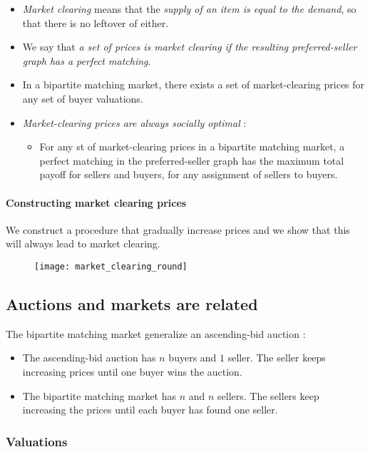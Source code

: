 \begin{itemize}
\item \textit{Market clearing} means that the \textit{supply of an item is equal to the demand}, so that there is no leftover of either.
\item We say that \textit{a set of prices is market clearing if the resulting preferred-seller graph has a perfect matching}.
\item In a bipartite matching market, there exists a set of market-clearing prices for any set of buyer valuations.
\item \textit{Market-clearing prices are always socially optimal} :
	\begin{itemize}
	\item For any st of market-clearing prices in a bipartite matching market, a perfect matching in the preferred-seller graph has the maximum total payoff for sellers and buyers, for any assignment of sellers to buyers.
	\end{itemize}
\end{itemize}

\paragraph{Constructing market clearing prices}

We construct a procedure that gradually increase prices and we show that this will always lead to market clearing.

\begin{figure}[H]
    \centering
    \texttt{[image: market\_clearing\_round]}
\end{figure}

\subsection{Auctions and markets are related}

The bipartite matching market generalize an ascending-bid auction :
\begin{itemize}
\item The ascending-bid auction has $n$ buyers and $1$ seller. The seller keeps increasing prices until one buyer wins the auction.
\item The bipartite matching market has $n$ and $n$ sellers. The sellers keep increasing the prices until each buyer has found one seller.
\end{itemize}

\subsubsection{Valuations}

